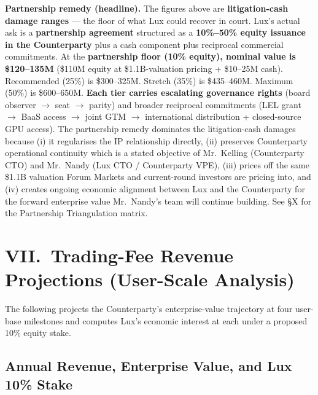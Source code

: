 \documentclass[11pt,letterpaper]{article}
\begin{document}
\textbf{Partnership remedy (headline).} The figures above are
\textbf{litigation-cash damage ranges} --- the floor of what Lux could
recover in court. Lux's actual ask is a \textbf{partnership
agreement} structured as a \textbf{10\%--50\% equity issuance in the
Counterparty} plus a cash component plus reciprocal commercial
commitments. At the \textbf{partnership floor (10\% equity), nominal
value is \$120--135M} (\$110M equity at \$1.1B-valuation pricing +
\$10--25M cash). Recommended (25\%) is \$300--325M. Stretch (35\%) is
\$435--460M. Maximum (50\%) is \$600--650M. \textbf{Each tier carries
escalating governance rights} (board observer $\to$ seat $\to$ parity)
and broader reciprocal commitments (LEL grant $\to$ BaaS access $\to$
joint GTM $\to$ international distribution + closed-source GPU
access). The partnership remedy dominates the litigation-cash damages
because (i) it regularises the IP relationship directly, (ii)
preserves Counterparty operational continuity which is a stated
objective of Mr.\ Kelling (Counterparty CTO) and Mr.\ Nandy (Lux CTO /
Counterparty VPE), (iii) prices off the same \$1.1B valuation Forum
Markets and current-round investors are pricing into, and (iv) creates
ongoing economic alignment between Lux and the Counterparty for the
forward enterprise value Mr.\ Nandy's team will continue building.
See \S X for the Partnership Triangulation matrix.

\section*{VII.\ Trading-Fee Revenue Projections (User-Scale Analysis)}

The following projects the Counterparty's enterprise-value trajectory
at four user-base milestones and computes Lux's economic interest at
each under a proposed 10\% equity stake.

\subsection*{Annual Revenue, Enterprise Value, and Lux 10\% Stake}
\end{document}
